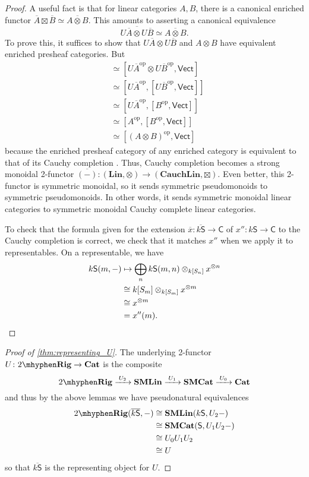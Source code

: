 \documentclass[12pt,reqno]{amsart}
\theoremstyle{plain}
\theoremstyle{definition}
\theoremstyle{remark}
\newcommand{\maps}{\colon}
\newcommand{\op}{^\mathrm{op}}
\newcommand{\category}[1]{\mathsf{#1}}
\newcommand{\C}{\category C}
\renewcommand{\S}{\category S}
\newcommand{\namedcat}[1]{\mathsf{#1}}
\newcommand{\SMC}{\namedbicat{SMCat}}
\newcommand{\SMLin}{\namedbicat{SMLin}}
\newcommand{\TRig}{2\mhyphen\namedbicat{Rig}}
\newcommand{\Vect}{\namedcat{Vect}}
\newcommand{\namedbicat}[1]{\mathbf{#1}}
\newcommand{\CCat}{\namedbicat{Cat}}
\newcommand{\Lin}{\namedbicat{Lin}}
\newcommand{\Cauch}{\namedbicat{Cauch}}
\newcommand{\ksbar}{\overline{k\S}}
\numberwithin{thm}{section}
\begin{document}
\begin{proof}
    A useful fact is that for linear categories $A, B$, there is a canonical enriched functor  $\overline{A} \boxtimes \overline{B} \simeq \overline{A \otimes B}$. This amounts to asserting a canonical equivalence 
    \[ 
        \overline{U\overline{A} \otimes U\overline{B}} \simeq \overline{A \otimes B}.
    \]
    To prove this, it suffices to show that $U\overline{A} \otimes U \overline{B}$ and $A \otimes B$ have equivalent enriched presheaf categories. But 
    \begin{align*}
        [(U\overline{A} \otimes U\overline{B})\op, \Vect]
        &\simeq [U\overline{A}\op \otimes U\overline{B}\op, \Vect]
        \\&\simeq [U\overline{A}\op, [U\overline{B}\op, \Vect]]
        \\&\simeq [U\overline{A}\op, [B\op, \Vect]]
        \\&\simeq [A\op, [B\op, \Vect]]
        \\&\simeq [(A \otimes B)\op, \Vect]
    \end{align*}
    because the enriched presheaf category of any enriched category is equivalent to that of its Cauchy completion \cite{Kelly, AbsoluteColimEnriched}. Thus, Cauchy completion becomes a strong monoidal 2-functor $\overline{(-)} \maps (\Lin, \otimes) \to (\Cauch\Lin, \boxtimes)$. Even better, this 2-functor is symmetric monoidal, so it sends symmetric pseudomonoids to symmetric pseudomonoids. In other words, it sends symmetric monoidal linear categories to symmetric monoidal Cauchy complete linear categories.
        
    To check that the formula given for the extension $\overline x \maps \ksbar \to \C$ of $x'' \maps k\S \to \C$ to the Cauchy completion is correct, we check that it matches $x''$ when we apply it to representables. On a representable, we have
    \begin{align*}
        k\S(m, -) 
        & \mapsto \bigoplus_n k\S(m, n) \otimes_{k[S_n]} x^{\otimes n}
        \\&\cong k[S_m] \otimes_{k[S_m]} x^{\otimes m}
        \\&\cong x^{\otimes m} 
        \\&= x''(m). \qedhere  
    \end{align*}
\end{proof}

\begin{proof}[Proof of \cref{thm:representing_U}]
    The underlying 2-functor $U \maps \TRig \to \CCat$ is the composite 
    \[
        \TRig \xrightarrow{\; U_2\; } \SMLin \xrightarrow{\; U_1 \;} \SMC \xrightarrow{\; U_0 \;} \CCat
    \] 
    and thus by the above lemmas we have pseudonatural equivalences 
    \begin{align*}
        \TRig( \ksbar, -) 
        & \cong \SMLin(k\S, U_2 -) \\
        & \cong \SMC(\S, U_1 U_2 -) \\
        & \cong U_0 U_1 U_2 \\
        & \cong U
    \end{align*}
    so that $\ksbar$ is the representing object for $U$. 
\end{proof}
\end{document}
